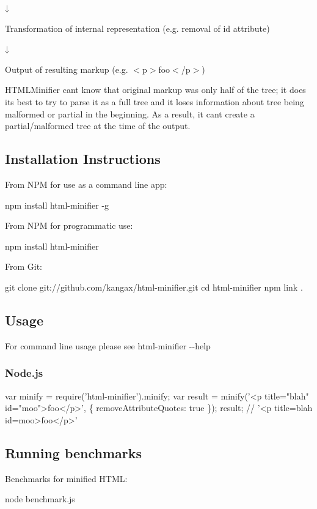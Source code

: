 ↓

Transformation of internal representation (e.\+g. removal of {\ttfamily id} attribute)

↓

Output of resulting markup (e.\+g. {\ttfamily $<$p$>$foo$<$/p$>$})

H\+T\+M\+L\+Minifier can\textquotesingle{}t know that original markup was only half of the tree; it does its best to try to parse it as a full tree and it loses information about tree being malformed or partial in the beginning. As a result, it can\textquotesingle{}t create a partial/malformed tree at the time of the output.

\subsection*{Installation Instructions}

From N\+PM for use as a command line app\+:


\begin{DoxyCode}
npm install html-minifier -g
\end{DoxyCode}


From N\+PM for programmatic use\+:


\begin{DoxyCode}
npm install html-minifier
\end{DoxyCode}


From Git\+:


\begin{DoxyCode}
git clone git://github.com/kangax/html-minifier.git
cd html-minifier
npm link .
\end{DoxyCode}


\subsection*{Usage}

For command line usage please see {\ttfamily html-\/minifier -\/-\/help}

\subsubsection*{Node.\+js}


\begin{DoxyCode}
var minify = require('html-minifier').minify;
var result = minify('<p title="blah" id="moo">foo</p>', \{
  removeAttributeQuotes: true
\});
result; // '<p title=blah id=moo>foo</p>'
\end{DoxyCode}


\subsection*{Running benchmarks}

Benchmarks for minified H\+T\+ML\+:


\begin{DoxyCode}
node benchmark.js
\end{DoxyCode}
 